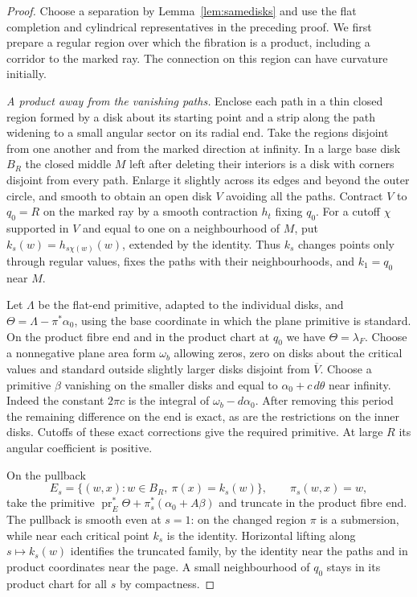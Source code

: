\begin{proof}
Choose a separation by Lemma~\ref{lem:samedisks} and use the flat completion and cylindrical representatives in the preceding proof. We first prepare a regular region over which the fibration is a product, including a corridor to the marked ray. The connection on this region can have curvature initially.

\medskip
\noindent\emph{A product away from the vanishing paths.}
Enclose each path in a thin closed region formed by a disk about its starting point and a strip along the path widening to a small angular sector on its radial end. Take the regions disjoint from one another and from the marked direction at infinity. In a large base disk $B_R$ the closed middle $M$ left after deleting their interiors is a disk with corners disjoint from every path. Enlarge it slightly across its edges and beyond the outer circle, and smooth to obtain an open disk $V$ avoiding all the paths. Contract $V$ to $q_0=R$ on the marked ray by a smooth contraction $h_t$ fixing $q_0$. For a cutoff $\chi$ supported in $V$ and equal to one on a neighbourhood of $M$, put $k_s(w)=h_{s\chi(w)}(w)$, extended by the identity. Thus $k_s$ changes points only through regular values, fixes the paths with their neighbourhoods, and $k_1=q_0$ near $M$.

Let $\Lambda$ be the flat-end primitive, adapted to the individual disks, and $\Theta=\Lambda-\pi^*\alpha_0$, using the base coordinate in which the plane primitive is standard. On the product fibre end and in the product chart at $q_0$ we have $\Theta=\lambda_F$. Choose a nonnegative plane area form $\omega_b$ allowing zeros, zero on disks about the critical values and standard outside slightly larger disks disjoint from $\overline V$. Choose a primitive $\beta$ vanishing on the smaller disks and equal to $\alpha_0+c\,d\theta$ near infinity. Indeed the constant $2\pi c$ is the integral of $\omega_b-d\alpha_0$. After removing this period the remaining difference on the end is exact, as are the restrictions on the inner disks. Cutoffs of these exact corrections give the required primitive. At large $R$ its angular coefficient is positive.

On the pullback
\[
 E_s=\{(w,x):w\in B_R,\ \pi(x)=k_s(w)\},\qquad \pi_s(w,x)=w,
\]
take the primitive $\operatorname{pr}_E^*\Theta+\pi_s^*(\alpha_0+A\beta)$ and truncate in the product fibre end. The pullback is smooth even at $s=1$: on the changed region $\pi$ is a submersion, while near each critical point $k_s$ is the identity. Horizontal lifting along $s\mapsto k_s(w)$ identifies the truncated family, by the identity near the paths and in product coordinates near the page. A small neighbourhood of $q_0$ stays in its product chart for all $s$ by compactness.


\end{proof}
